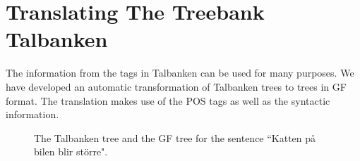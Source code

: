 \documentclass[10pt, a4paper]{article}
\begin{document}
\section{Translating The Treebank Talbanken}
\label{sec:mapping}
The information from the tags in Talbanken can be used for many purposes.
We have developed an automatic transformation of Talbanken trees 
to trees in GF format. The translation makes use of the POS tags as well as
the syntactic information. 
\begin{figure}[h!]
\begin{center}
\hspace{-30mm}
\hspace{-10mm}
\caption{The Talbanken tree and the GF tree for the sentence ``Katten p{\aa} bilen blir st{\"o}rre".}
\label{fig:translationtrees}
\end{center}
\end{figure}
\end{document}
